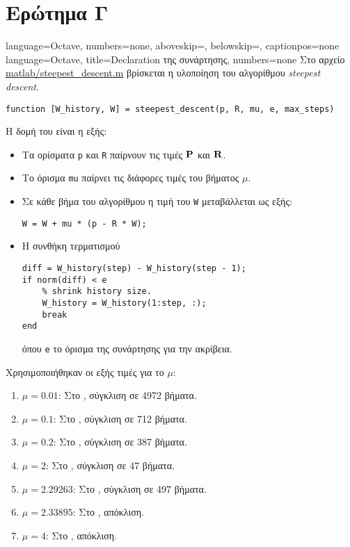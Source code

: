 \section{Ερώτημα Γ}
\newcommand{\plothere}[2]{%
\begin{figure}[htbp]%
\centering%
\texttt{[image: plots/\#1]}%
\caption{#2}
\label{fig:#1}%
\end{figure}%
}
{language=Octave,
numbers=none,
aboveskip=\smallskipamount,
belowskip=\smallskipamount,
captionpos=none
}
{language=Octave,
title={Declaration της συνάρτησης},
numbers=none
}
Στο αρχείο \url{matlab/steepest_descent.m} βρίσκεται η υλοποίηση του αλγορίθμου \textit{steepest descent}.
\begin{lstlisting}[style=declaration]
function [W_history, W] = steepest_descent(p, R, mu, e, max_steps)
\end{lstlisting}
Η δομή του είναι η εξής:
\begin{itemize}
\item Τα ορίσματα \lstinline!p! και \lstinline!R! παίρνουν τις τιμές $\mathbf{P}$ και $\mathbf{R}$.
\item Το όρισμα \lstinline!mu! παίρνει τις διάφορες τιμές του βήματος $\mu$.
\item Σε κάθε βήμα του αλγορίθμου η τιμή του \lstinline!W! μεταβάλλεται ως εξής:
\begin{lstlisting}[style=chunk]
W = W + mu * (p - R * W);
\end{lstlisting}
\item Η συνθήκη τερματισμού 
\begin{lstlisting}[style=chunk]
diff = W_history(step) - W_history(step - 1);
if norm(diff) < e
    % shrink history size.
    W_history = W_history(1:step, :);
    break
end
\end{lstlisting}
όπου \lstinline!e! το όρισμα της συνάρτησης για την ακρίβεια.
\end{itemize}

Χρησιμοποιήθηκαν οι εξής τιμές για το $\mu$:
\begin{enumerate}
\item $\mu=0.01$: Στο , σύγκλιση σε 4972 βήματα.
\item $\mu=0.1$: Στο , σύγκλιση σε 712 βήματα.
\item $\mu=0.2$: Στο , σύγκλιση σε 387 βήματα.
\item $\mu=2$: Στο , σύγκλιση σε 47 βήματα.
\item $\mu=2.29263$: Στο , σύγκλιση σε 497 βήματα.
\item $\mu=2.33895$: Στο , απόκλιση.
\item $\mu=4$: Στο , απόκλιση.
\end{enumerate}

